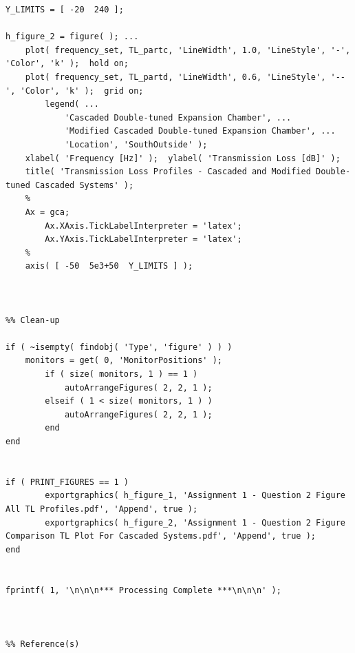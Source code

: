 \begin{lstlisting}[style=Matlab-editor, basicstyle=\fontfamily{pcr}, numbers=none, keepspaces, mlshowsectionrules, basicstyle=\footnotesize]
Y_LIMITS = [ -20  240 ];

h_figure_2 = figure( ); ...
    plot( frequency_set, TL_partc, 'LineWidth', 1.0, 'LineStyle', '-', 'Color', 'k' );  hold on;
    plot( frequency_set, TL_partd, 'LineWidth', 0.6, 'LineStyle', '--', 'Color', 'k' );  grid on;
        legend( ...
            'Cascaded Double-tuned Expansion Chamber', ...
            'Modified Cascaded Double-tuned Expansion Chamber', ...
            'Location', 'SouthOutside' );
    xlabel( 'Frequency [Hz]' );  ylabel( 'Transmission Loss [dB]' );
    title( 'Transmission Loss Profiles - Cascaded and Modified Double-tuned Cascaded Systems' );
    %
    Ax = gca;
        Ax.XAxis.TickLabelInterpreter = 'latex';
        Ax.YAxis.TickLabelInterpreter = 'latex';
    %
    axis( [ -50  5e3+50  Y_LIMITS ] );



%% Clean-up

if ( ~isempty( findobj( 'Type', 'figure' ) ) )
    monitors = get( 0, 'MonitorPositions' );
        if ( size( monitors, 1 ) == 1 )
            autoArrangeFigures( 2, 2, 1 );
        elseif ( 1 < size( monitors, 1 ) )
            autoArrangeFigures( 2, 2, 1 );
        end
end


if ( PRINT_FIGURES == 1 )
        exportgraphics( h_figure_1, 'Assignment 1 - Question 2 Figure All TL Profiles.pdf', 'Append', true );
        exportgraphics( h_figure_2, 'Assignment 1 - Question 2 Figure Comparison TL Plot For Cascaded Systems.pdf', 'Append', true );
end


fprintf( 1, '\n\n\n*** Processing Complete ***\n\n\n' );



%% Reference(s)
\end{lstlisting}



















































